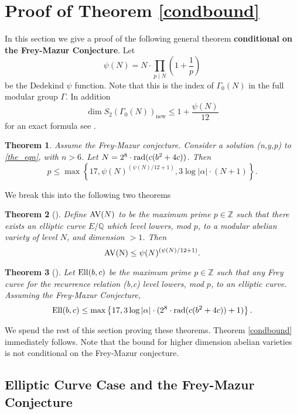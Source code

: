 \documentclass[12pt]{amsart}
\newtheorem{thm}{Theorem}[section]
\theoremstyle{definition}
\def\Q{{\mathbb Q}}
\def\Z{{\mathbb Z}}
\newcommand{\rad}{{\rm{rad}}}
\newcommand{\Ell}{\rm{Ell}}
\newcommand{\AV}{\rm{AV}}
\begin{document}
\section{Proof of Theorem \ref{condbound}}\label{genthmproof}

In this section we give a proof of the following general theorem \textbf{conditional on the Frey-Mazur Conjecture}.  Let 
\[\psi(N) = N \cdot \prod_{p \mid N} \left( 1 + \frac{1}{p} \right) \]
be the Dedekind $\psi$ function.  Note that this is the index of $\Gamma_0(N)$ in the full modular group $\Gamma$. In addition 
\[ \dim S_2(\Gamma_0(N))_{\text{new}} \leq 1 + \frac{\psi(N)}{12} \]
for an exact formula see \cite{stein07}.

\begin{thm}\label{condbound_inplace}
Assume the Frey-Mazur conjecture.  Consider a solution (n,y,p) to \eqref{the_eqn}, with $n > 6$. Let $N = 2^8 \cdot \rad(c(b^2+4c))$. Then 
\[ p \leq \max\left\{17,   \psi(N)^{(\psi(N)/12 + 1)}, 3\log{|\alpha|} \cdot ( N+1)  \right\}. \]
\end{thm}

We break this into the following two theorems

\begin{thm}[]\label{bound_av}
Define ${\AV}(N)$ to be the maximum prime $p \in \Z$ such that there exists an elliptic curve $E/\Q$ which level lowers, mod $p$, to a modular abelian variety of level $N$, and dimension $> 1$.  Then
\[{\AV(N)} \leq \psi(N)^{(\psi(N)/12+1)}. \]
\end{thm}

\begin{thm}[]\label{bound_ell}
Let ${\Ell}(b,c)$ be the maximum prime $p \in \Z$ such that any Frey curve for the recurrence relation (b,c) level lowers, mod $p$, to an elliptic curve.  Assuming the Frey-Mazur Conjecture, 
\[{\Ell}(b,c) \leq \max\left\{17, 3\log{|\alpha|} \cdot (2^{8} \cdot \rad(c(b^2+4c))+1) \right\}. \]
\end{thm}


We spend the rest of this section proving these theorems. Theorem \ref{condbound} immediately follows.  Note that the bound for higher dimension abelian varieties is not conditional on the Frey-Mazur conjecture.



\subsection{Elliptic Curve Case and the Frey-Mazur Conjecture}
\end{document}
